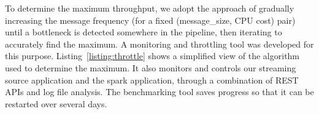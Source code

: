 \documentclass[conference]{IEEEtran}
\begin{document}
To determine the maximum throughput, we adopt the approach of gradually increasing the message frequency (for a fixed (message\_size, CPU cost) pair) until a bottleneck is detected somewhere in the pipeline, then iterating to accurately find the maximum. A monitoring and throttling tool was developed for this purpose. Listing~\ref{listing:throttle} shows a simplified view of the algorithm used to determine the maximum. It also monitors and controls our streaming source application and the spark application, through a combination of REST APIs and log file analysis. 
The benchmarking tool saves progress so that it can be restarted over several days. 





\end{document}
